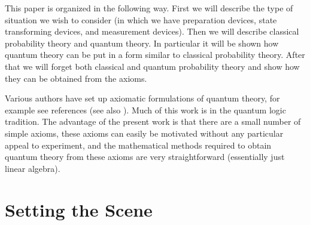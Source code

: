 \documentclass[10pt,twocolumn]{article}
\begin{document}
This paper is organized in the following way.  First we will describe
the type of situation we wish to consider (in which we have preparation
devices, state transforming devices, and measurement devices).  Then we
will describe classical probability theory and quantum
theory.  In particular it will be shown how quantum theory can be put in
a form similar to classical probability theory.  After that we will
forget both classical and quantum probability theory and show how they
can be obtained from the axioms.

Various authors have set up axiomatic formulations of quantum
theory, for example see references
\cite{birkoff,mackey,piron,ludwig,mielnik,lande,fivel,accardi,landsman,cmw}
(see
also \cite{gleason,kochen,pitowsky}). Much of this work is in the quantum logic
tradition.  The advantage of the present work is that there
are a small number of simple axioms, these axioms can easily
be motivated without any particular appeal to experiment,
and the mathematical methods required to obtain quantum theory from
these axioms are very straightforward (essentially just linear algebra).



\section{Setting the Scene}
\end{document}

